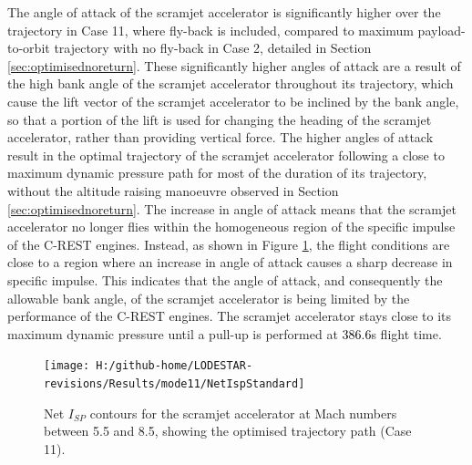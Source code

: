 The angle of attack of the scramjet accelerator is significantly higher over the trajectory in Case 11, where fly-back is included, compared to maximum payload-to-orbit trajectory with no fly-back in Case 2, detailed in Section \ref{sec:optimisednoreturn}. These significantly  higher angles of attack are a result of the high bank angle of the scramjet accelerator throughout its trajectory, which cause the lift vector of the scramjet accelerator to be inclined by the bank angle, so that a portion of the lift is used for changing the heading of the scramjet accelerator, rather than providing vertical force. 
 The higher angles of attack result in the optimal trajectory of the scramjet accelerator following a close to maximum dynamic pressure path for most of the duration of its trajectory, without the altitude raising manoeuvre observed in Section \ref{sec:optimisednoreturn}.
 The increase in angle of attack means that the scramjet accelerator no longer flies within the homogeneous region of the specific impulse of the C-REST engines. Instead, as shown in Figure \ref{fig:NetIspStandard}, the flight conditions are close to a region where an increase in angle of attack causes a sharp decrease in specific impulse. 
This indicates that the angle of attack, and consequently the allowable bank angle, of the scramjet accelerator is being limited by the performance of the C-REST engines. 
 The scramjet accelerator stays close to its maximum dynamic pressure until a pull-up is performed at \textcolor{black}{386.6}s flight time. 
 \begin{figure}[!ht]%
 	\centering
 	\texttt{[image: H:/github-home/LODESTAR-revisions/Results/mode11/NetIspStandard]}
 	\caption{Net $I_{SP}$ contours for the scramjet accelerator at Mach numbers between 5.5 and 8.5, showing the optimised trajectory path (Case 11). }
 	\label{fig:NetIspStandard}
 \end{figure}

